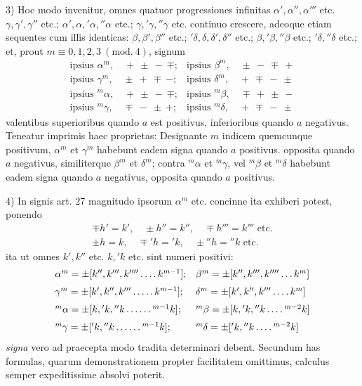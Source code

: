 3) Hoc modo invenitur, omnes quatuor progressiones infinitas $\alpha',\alpha'',\alpha'''$ etc. $\gamma,\gamma',\gamma''$ etc.; $\alpha',\alpha,{}'\alpha,{}''\alpha$ etc.; $\gamma,{}'\gamma,{}''\gamma$ etc. continuo crescere, adeoque etiam sequentes cum illis identicas: $\beta,\beta',\beta''$ etc.; ${}'\delta,\delta,\delta',\delta''$ etc.; $\beta,{}'\beta,{}''\beta$ etc.; ${}'\delta,{}''\delta$ etc.; et, prout $m\equiv0,1,2,3\ (\mathrm{mod.}\ 4)$, signum
\[
\begin{array}{ll}
\text{ipsius }\alpha^m,\quad +\ \pm\ -\ \mp;&\text{ipsius }\beta^m,\quad \pm\ -\ \mp\ +\\[6pt]
\text{ipsius }\gamma^m,\quad \pm\ +\ \mp\ -;&\text{ipsius }\delta^m,\quad +\ \mp\ -\ \pm\\[6pt]
\text{ipsius }{}^m\alpha,\quad +\ \pm\ -\ \mp;&\text{ipsius }{}^m\beta,\quad \mp\ +\ \pm\ -\\[6pt]
\text{ipsius }{}^m\gamma,\quad \mp\ -\ \pm\ +;&\text{ipsius }{}^m\delta,\quad +\ \mp\ -\ \pm
\end{array}
\]
valentibus superioribus quando $a$ est positivus, inferioribus quando $a$ negativus. Teneatur imprimis haec proprietas: Designante $m$ indicem quemcunque positivum, $\alpha^m$ et $\gamma^m$ habebunt eadem signa quando $a$ {positivus. opposita} quando $a$ negativus, similiterque $\beta^m$ et $\delta^m$; contra ${}^m\alpha$ et ${}^m\gamma$, vel ${}^m\beta$ et ${}^m\delta$ habebunt eadem signa quando $a$ negativus, opposita quando $a$ positivus.

4) In signis art. 27 magnitudo ipsorum $\alpha^m$ etc. concinne ita exhiberi potest, ponendo
\[
\begin{gathered}
\mp h'=k',\quad \pm h''=k'',\quad \mp h'''=k'''\text{ etc.}\\
\pm h=k,\quad \mp{}'h={}'k,\quad \pm{}''h={}''k\text{ etc.}
\end{gathered}
\]
ita ut omnes $k',k''$ etc. $k,{}'k$ etc. sint numeri positivi:
{\small
\setlength{\arraycolsep}{3pt}
\[
\begin{array}{ll}
\alpha^m=\pm[k'',k''',k''''\mathinner{\ldotp\ldotp\ldotp\ldotp} k^{m-1}];&\beta^m=\pm[k'',k''',k''''\mathinner{\ldotp\ldotp\ldotp} {k^m]}\\[6pt]
\gamma^m=\pm[k',k'',k'''\mathinner{\ldotp\ldotp\ldotp\ldotp\ldotp} k^{m-1}];&\delta^m=\pm[k',k'',k'''\mathinner{\ldotp\ldotp\ldotp\ldotp} k^m]\\[6pt]
{}^m\alpha=\pm[k,{}'k,{}''k\mathinner{\ldotp\ldotp\ldotp\ldotp\ldotp\ldotp}{}^{m-1}k];&{}^m\beta=\pm[k,{}'k,{}''k\mathinner{\ldotp\ldotp\ldotp\ldotp}{}^{m-2}k]\\[6pt]
{}^m\gamma=\pm[{}'k,{}''k\mathinner{\ldotp\ldotp\ldotp\ldotp\ldotp\ldotp}{}^{m-1}k];&{}^m\delta=\pm[{}'k,{}''k\mathinner{\ldotp\ldotp\ldotp\ldotp}{}^{m-2}k]
\end{array}
\]
}
\textit{signa} vero ad praecepta modo tradita determinari debent. Secundum has formulas, quarum demonstrationem propter facilitatem omittimus, calculus semper expeditissime absolvi poterit.

